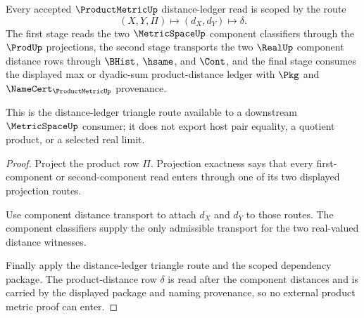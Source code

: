 \begin{theorem}
\label{thm:productmetric-distance-ledger-scope}
Every accepted $\ProductMetricUp$ distance-ledger read is scoped by the route
$$
(X,Y,\Pi) \longmapsto (d_X,d_Y) \longmapsto \delta.
$$
The first stage reads the two $\MetricSpaceUp$ component classifiers through the $\ProdUp$ projections, the second stage transports the two $\RealUp$ component distance rows through $\BHist$, $\hsame$, and $\Cont$, and the final stage consumes the displayed max or dyadic-sum product-distance ledger with $\Pkg$ and $\NameCert_{\ProductMetricUp}$ provenance.

This is the distance-ledger triangle route available to a downstream $\MetricSpaceUp$ consumer; it does not export host pair equality, a quotient product, or a selected real limit.
\end{theorem}
\begin{proof}
Project the product row $\Pi$. Projection exactness says that every first-component or second-component read enters through one of its two displayed projection routes.

Use component distance transport to attach $d_X$ and $d_Y$ to those routes. The component classifiers supply the only admissible transport for the two real-valued distance witnesses.

Finally apply the distance-ledger triangle route and the scoped dependency package. The product-distance row $\delta$ is read after the component distances and is carried by the displayed package and naming provenance, so no external product metric proof can enter.
\end{proof}

